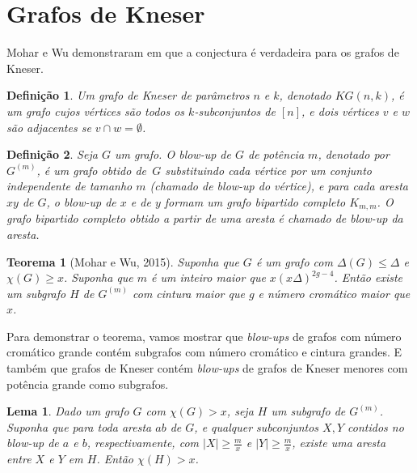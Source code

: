 \documentclass{article}
\newtheorem{teorema}{Teorema}[section]
\newtheorem{lema}{Lema}[teorema]
\newtheorem{definicao}{Definição}[section]
\begin{document}
\section{Grafos de Kneser}
Mohar e Wu demonstraram em \cite{mohar2015triangle} que a conjectura é verdadeira para os grafos de Kneser.

\begin{definicao}
Um grafo de Kneser de parâmetros $n$ e $k$, denotado $KG(n,k)$, é um grafo cujos vértices são todos os $k$-subconjuntos de $[n]$, e dois vértices $v$ e $w$ são adjacentes se $v \cap w = \emptyset$.
\end{definicao}

\begin{definicao}
Seja $G$ um grafo. O \textit{blow-up} de $G$ de potência $m$, denotado por $G^{(m)}$, é um grafo obtido de~$G$ substituindo cada vértice por um conjunto independente de tamanho $m$ (chamado de \textit{blow-up} do vértice), e para cada aresta $xy$ de $G$, o \textit{blow-up} de $x$ e de $y$ formam um grafo bipartido completo $K_{m,m}$. O grafo bipartido completo obtido a partir de uma aresta é chamado de \textit{blow-up} da aresta.
\end{definicao}

\begin{teorema}[Mohar e Wu, 2015]\label{moharwuthm}
Suponha que $G$ é um grafo com $\Delta(G) \leq \Delta$ e $\chi(G) \geq x$. Suponha que $m$ é um inteiro maior que $x(x\Delta)^{2g-4}$. Então existe um subgrafo $H$ de $G^{(m)}$ com cintura maior que $g$ e número cromático maior que $x$.
\end{teorema}

Para demonstrar o teorema, vamos mostrar que \textit{blow-ups} de grafos com número cromático grande contém subgrafos com número cromático e cintura grandes. E também que grafos de Kneser contém \textit{blow-ups} de grafos de Kneser menores com potência grande como subgrafos.

\begin{lema}\label{lemma1kg}
Dado um grafo $G$ com $\chi(G) > x$, seja $H$ um subgrafo de $G^{(m)}$. Suponha que para toda aresta $ab$ de $G$, e qualquer subconjuntos $X,Y$ contidos no \textit{blow-up} de $a$ e $b$, respectivamente, com $|X| \geq \frac{m}{x}$ e $|Y| \geq \frac{m}{x}$, existe uma aresta entre $X$ e $Y$ em $H$. Então $\chi(H) > x$.
\end{lema}
\end{document}
